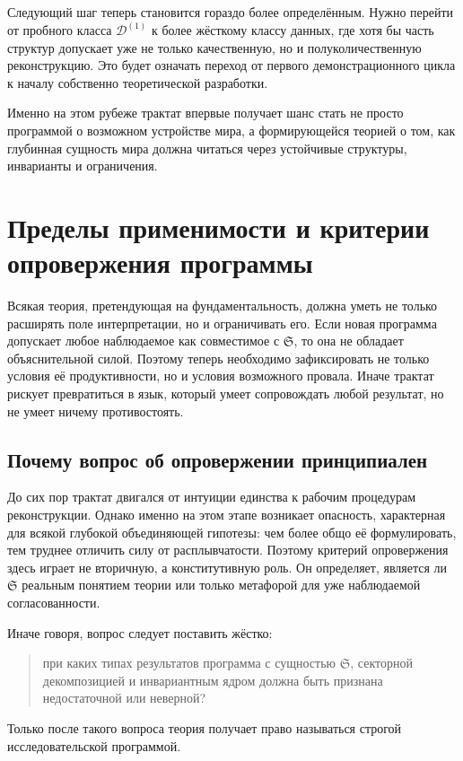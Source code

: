 \documentclass[12pt,a4paper]{article}
\begin{document}
Следующий шаг теперь становится гораздо более определённым. Нужно перейти от пробного класса \(\mathcal{D}^{(1)}\) к более жёсткому классу данных, где хотя бы часть структур допускает уже не только качественную, но и полуколичественную реконструкцию. Это будет означать переход от первого демонстрационного цикла к началу собственно теоретической разработки.

Именно на этом рубеже трактат впервые получает шанс стать не просто программой о возможном устройстве мира, а формирующейся теорией о том, как глубинная сущность мира должна читаться через устойчивые структуры, инварианты и ограничения.


\section{Пределы применимости и критерии опровержения программы}

Всякая теория, претендующая на фундаментальность, должна уметь не только расширять поле интерпретации, но и ограничивать его. Если новая программа допускает любое наблюдаемое как совместимое с \(\mathfrak{S}\), то она не обладает объяснительной силой. Поэтому теперь необходимо зафиксировать не только условия её продуктивности, но и условия возможного провала. Иначе трактат рискует превратиться в язык, который умеет сопровождать любой результат, но не умеет ничему противостоять.

\subsection{Почему вопрос об опровержении принципиален}

До сих пор трактат двигался от интуиции единства к рабочим процедурам реконструкции. Однако именно на этом этапе возникает опасность, характерная для всякой глубокой объединяющей гипотезы: чем более общо её формулировать, тем труднее отличить силу от расплывчатости. Поэтому критерий опровержения здесь играет не вторичную, а конститутивную роль. Он определяет, является ли \(\mathfrak{S}\) реальным понятием теории или только метафорой для уже наблюдаемой согласованности.

Иначе говоря, вопрос следует поставить жёстко:
\begin{quote}
при каких типах результатов программа с сущностью \(\mathfrak{S}\), секторной декомпозицией и инвариантным ядром должна быть признана недостаточной или неверной?
\end{quote}

Только после такого вопроса теория получает право называться строгой исследовательской программой.
\end{document}
